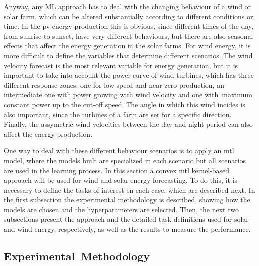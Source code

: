 Anyway, any ML approach has to deal with the changing behaviour of a wind or solar farm, which can be altered substantially according to different conditions or time.
In the \acrfull{pv} energy production this is obvious, since different times of the day, from sunrise to sunset, have very different behaviours, but there are also seasonal effects that affect the energy generation in the solar farms.
For wind energy, it is more difficult to define the variables that determine different scenarios. 
The wind velocity forecast is the most relevant variable for energy generation, but it is important to take into account the power curve of wind turbines, which has three different response zones: one for low speed and near zero production, an intermediate one with power growing with wind velocity and one with~maximum constant power up to the cut-off speed.
The angle in which this wind incides is also important, since the turbines of a farm are set for a specific direction. 
Finally, the assymetric wind velocities between the day and night period can also affect the energy production.

One way to deal with these different behaviour scenarios is to apply an \acrshort{mtl} model, where the models built are specialized in each scenario but all scenarios are used in the learning process.
In this section a convex \acrshort{mtl} kernel-based approach will be used for wind and solar energy forecasting. To do this, it is necessary to define the tasks of interest on each case, which are described next.
In the first subsection the experimental methodology is described, showing how the models are chosen and the hyperparameters are selected. Then, the next two subsections present the approach and the detailed task definitions used for solar and wind energy, respectively, as well as the results to measure the performance.

\subsection{Experimental~Methodology}

